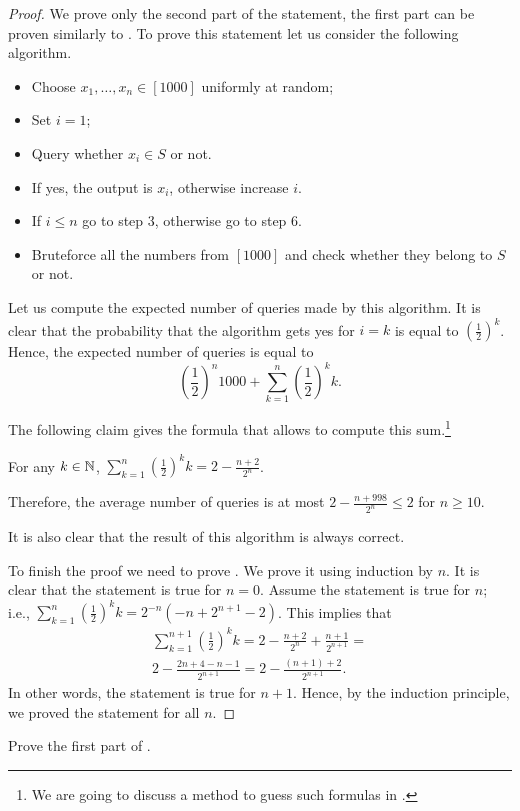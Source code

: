 \begin{proof}
  We prove only the second part of the statement, the first part can be proven
  similarly to .
  To prove this statement let us consider the following algorithm.
  \begin{itemize}
    \item Choose $x_1, \dots, x_n \in [1000]$ uniformly at random;
    \item Set $i = 1$;
    \item Query whether $x_i \in S$ or not.
    \item If yes, the output is $x_i$, otherwise increase $i$.
    \item If $i \le n$ go to step $3$, otherwise go to step $6$.
    \item Bruteforce all the numbers from $[1000]$ and check whether they belong
      to $S$ or not.
  \end{itemize}
  Let us compute the expected number of queries made by this algorithm. It is
  clear that the probability that the algorithm gets yes for $i = k$ is equal to
  $\left(\frac{1}{2}\right)^k$. Hence, the expected number of queries is equal
  to 
  \[
    \left(\frac{1}{2}\right)^n 1000 + 
    \sum_{k = 1}^n \left(\frac{1}{2}\right)^k k.
  \]

  The following claim gives the formula that allows to compute this
  sum.\footnote{%
    We are going to discuss a method to guess such formulas in
    .
  }
  \begin{claim}
  \label{claim:guess-one-out-of-many}
      For any $k \in {\mathbb{N}}$, $\sum_{k = 1}^n \left(\frac{1}{2}\right)^k k = 
      2 - \frac{n + 2}{2^n}$.
  \end{claim}

  Therefore, the average number of queries is at most 
  $2 - \frac{n + 998}{2^n} \le 2$ for $n \ge 10$.

  It is also clear that the result of this algorithm is always correct.

  To finish the proof we need to prove .
  We prove it using induction by $n$. It is clear that the statement is true for
  $n = 0$. Assume the statement is true for $n$; i.e., 
  $\sum_{k = 1}^n \left(\frac{1}{2}\right)^k k = 2^{-n} (-n + 2^{n + 1} - 2)$.
  This implies that 
  \begin{multline*}
    \sum_{k = 1}^{n + 1} \left(\frac{1}{2}\right)^k k = 
    2 - \frac{n + 2}{2^n} + \frac{n + 1}{2^{n + 1}} = \\
    2 - \frac{2n + 4 - n - 1}{2^{n + 1}} = 2 - \frac{(n + 1) + 2}{2^{n + 1}}.
  \end{multline*}
  In other words, the statement is true for $n + 1$. Hence, by the induction
  principle, we proved the statement for all $n$.
\end{proof}

\begin{chapterendexercises}
  \exercise Prove the first part of .
\end{chapterendexercises}
